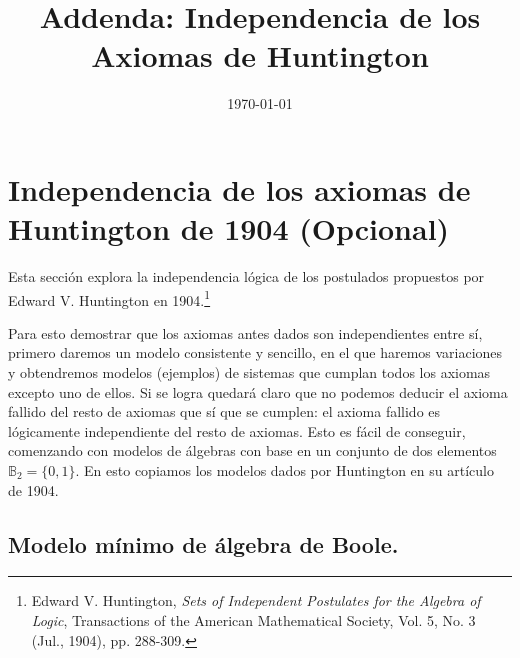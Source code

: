 \documentclass[12pt,a4paper]{article}
\title{Addenda: Independencia de los Axiomas de Huntington}
\author{}
\date{\today}
\newcommand{\set}[1]{\ensuremath{\{#1\}}}
\begin{document}
\maketitle
\section{Independencia de los axiomas de Huntington de 1904 (Opcional)}
Esta sección explora la independencia lógica de los postulados propuestos por Edward V. Huntington en 1904.\footnote{Edward V. Huntington, \textit{Sets of Independent Postulates for the Algebra of Logic}, Transactions of the American Mathematical Society, Vol. 5, No. 3 (Jul., 1904), pp. 288-309.}

\newcommand{\fromto}{\ensuremath{\longrightarrow}}
\newcommand{\bfs}[1]{\ensuremath{\boldsymbol{#1}}}
\newcommand{\bfsf}[1]{\ensuremath{\bfs{\mathsf{#1}}}}
\newcommand{\funcsum}{\ensuremath{\bfs{\mathsf{s}}}}
\newcommand{\funcsumat}[2]{\ensuremath{\funcsum\left({#1,#2}\right)}}
\newcommand{\funcprod}{\ensuremath{\bfs{\mathsf{p}}}}
\newcommand{\funcprodat}[2]{\ensuremath{\funcprod\left({#1,#2}\right)}}
\newcommand{\mathdef}{\ensuremath{\stackrel{\mathsf{def}}{{}={}}}}
\newcommand{\pfmathdef}[2]{\ensuremath{{#1}{\mathdef}{#2}}}
\newcommand{\setB}{\ensuremath{\mathbb{B}}}

\newcommand{\funccomp}{\ensuremath{\bfsf{c}}}



	Para esto demostrar que los axiomas antes dados son independientes entre
sí, primero daremos un modelo consistente y sencillo, en el que haremos
variaciones y obtendremos modelos (ejemplos) de sistemas que cumplan todos
los axiomas excepto uno de ellos. Si se logra quedará claro que no podemos
deducir el axioma fallido del resto de axiomas que sí que se cumplen: el
axioma fallido es lógicamente independiente del resto de axiomas. Esto es
fácil de conseguir, comenzando con modelos de álgebras con base en un
conjunto de dos elementos \({\setB}_2 = \set{0,1}\). En esto copiamos los
modelos dados por Huntington en su artículo de 1904.



\subsection{Modelo mínimo de álgebra de Boole.}
\end{document}
